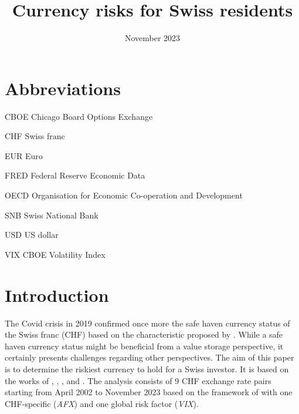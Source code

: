 \documentclass[a4paper,11pt,oneside]{article}
\title{Currency risks for Swiss residents}
\date{November 2023}
\newcommand{\abbrlabel}[1]{\makebox[1in][l]{\textbf{#1}\ }}
\newenvironment{Abbreviations}{\begin{list}{}{\renewcommand{\makelabel}{\abbrlabel}}}{\end{list}}
\begin{document}
\maketitle

\newpage
\pagestyle{plain}
\setcounter{page}{1}
\tableofcontents

\newpage
\pagestyle{plain}
\listoffigures
{}

\newpage
\begingroup
\vspace{4ex}
\let\clearpage\relax
\listoftables
\endgroup
{}

\newpage
\pagestyle{plain}
\section*{Abbreviations}
\begin{Abbreviations}
\item[CBOE] Chicago Board Options Exchange 
\item[CHF] Swiss franc
\item[EUR] Euro
\item[FRED] Federal Reserve Economic Data 
\item[OECD] Organisation for Economic Co-operation and Development
\item[SNB] Swiss National Bank
\item[USD] US dollar
\item[VIX] CBOE Volatility Index
\end{Abbreviations}


\newpage
\pagestyle{fancy}
\setcounter{page}{1}

\section{Introduction}\label{Introduction}
The Covid crisis in 2019 confirmed once more the safe haven currency status of the Swiss franc (CHF) based on the characteristic proposed by \cite{Habib and Stracca 2012}. While a safe haven currency status might be beneficial from a value storage perspective, it certainly presents challenges regarding other perspectives. The aim of this paper is to determine the riskiest currency to hold for a Swiss investor. It is based on the works of \cite{Grisse and Nitschka 2015}, \cite{Verdelhan 2010}, \cite{Backus and Foresi and Telmer 2001}, and \cite{Lustig and Roussanov and Verdelhan 2011}. The analysis consists of 9 CHF exchange rate pairs starting from April 2002 to November 2023 based on the framework of \cite{Grisse and Nitschka 2015} with one CHF-specific (\emph{AFX}) and one global risk factor (\emph{VIX}).\par
\end{document}
